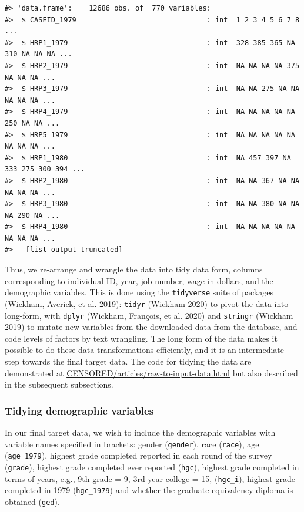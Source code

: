 \documentclass[12pt]{article}
\begin{document}
\begin{verbatim}
#> 'data.frame':    12686 obs. of  770 variables:
#>  $ CASEID_1979                               : int  1 2 3 4 5 6 7 8 ...
#>  $ HRP1_1979                                 : int  328 385 365 NA 310 NA NA NA ...
#>  $ HRP2_1979                                 : int  NA NA NA NA 375 NA NA NA ...
#>  $ HRP3_1979                                 : int  NA NA 275 NA NA NA NA NA ...
#>  $ HRP4_1979                                 : int  NA NA NA NA NA 250 NA NA ...
#>  $ HRP5_1979                                 : int  NA NA NA NA NA NA NA NA ...
#>  $ HRP1_1980                                 : int  NA 457 397 NA 333 275 300 394 ...
#>  $ HRP2_1980                                 : int  NA NA 367 NA NA NA NA NA ...
#>  $ HRP3_1980                                 : int  NA NA 380 NA NA NA 290 NA ...
#>  $ HRP4_1980                                 : int  NA NA NA NA NA NA NA NA ...
#>   [list output truncated]
\end{verbatim}

Thus, we re-arrange and wrangle the data into tidy data form, columns corresponding to individual ID, year, job number, wage in dollars, and the demographic variables. This is done using the \texttt{tidyverse} suite of packages (Wickham, Averick, et al. 2019): \texttt{tidyr} (Wickham 2020) to pivot the data into long-form, with \texttt{dplyr} (Wickham, François, et al. 2020) and \texttt{stringr} (Wickham 2019) to mutate new variables from the downloaded data from the database, and code levels of factors by text wrangling. The long form of the data makes it possible to do these data transformations efficiently, and it is an intermediate step towards the final target data. The code for tidying the data are demonstrated at \url{CENSORED/articles/raw-to-input-data.html} but also described in the subsequent subsections.

\hypertarget{tidydemog}{%
\subsubsection{Tidying demographic variables}\label{tidydemog}}

In our final target data, we wish to include the demographic variables with variable names specified in brackets: gender (\texttt{gender}), race (\texttt{race}), age (\texttt{age\_1979}), highest grade completed reported in each round of the survey (\texttt{grade}), highest grade completed ever reported (\texttt{hgc}), highest grade completed in terms of years, e.g., 9th grade = 9, 3rd-year college = 15, (\texttt{hgc\_i}), highest grade completed in 1979 (\texttt{hgc\_1979}) and whether the graduate equivalency diploma is obtained (\texttt{ged}).
\end{document}
